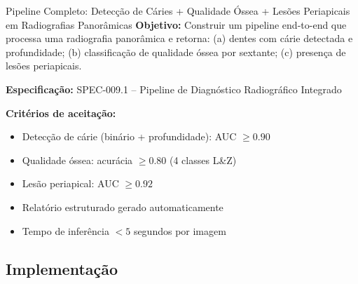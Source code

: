\begin{pratica}{Pipeline Completo: Detecção de Cáries + Qualidade Óssea + Lesões
Periapicais em Radiografias Panorâmicas}
  \textbf{Objetivo:} Construir um pipeline end-to-end que processa uma radiografia
  panorâmica e retorna: (a) dentes com cárie detectada e profundidade; (b)
  classificação de qualidade óssea por sextante; (c) presença de lesões periapicais.

  \textbf{Especificação:} SPEC-009.1 -- Pipeline de Diagnóstico Radiográfico Integrado

  \textbf{Critérios de aceitação:}
  \begin{itemize}
    \item Detecção de cárie (binário + profundidade): AUC $\geq 0.90$
    \item Qualidade óssea: acurácia $\geq 0.80$ (4 classes L\&Z)
    \item Lesão periapical: AUC $\geq 0.92$
    \item Relatório estruturado gerado automaticamente
    \item Tempo de inferência $< 5$ segundos por imagem
  \end{itemize}
\end{pratica}

\subsection{Implementação}

